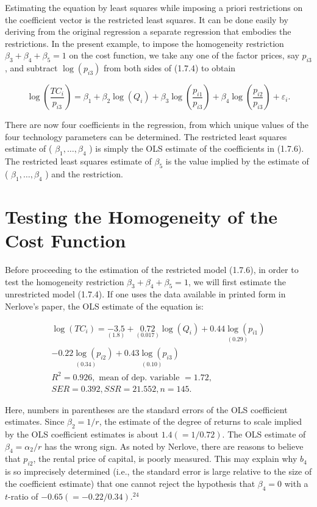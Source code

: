 \documentclass[10pt]{article}
\begin{document}
Estimating the equation by least squares while imposing a priori restrictions on the coefficient vector is the restricted least squares. It can be done easily by deriving from the original regression a separate regression that embodies the restrictions. In the present example, to impose the homogeneity restriction $\beta_{3}+\beta_{4}+\beta_{5}=1$ on the cost function, we take any one of the factor prices, say $p_{i 3}$, and subtract $\log \left(p_{i 3}\right)$ from both sides of (1.7.4) to obtain


\begin{equation*}
\log \left(\frac{T C_{i}}{p_{i 3}}\right)=\beta_{1}+\beta_{2} \log \left(Q_{i}\right)+\beta_{3} \log \left(\frac{p_{i 1}}{p_{i 3}}\right)+\beta_{4} \log \left(\frac{p_{i 2}}{p_{i 3}}\right)+\varepsilon_{i} . \tag{1.7.6}
\end{equation*}


There are now four coefficients in the regression, from which unique values of the four technology parameters can be determined. The restricted least squares estimate of ( $\beta_{1}, \ldots, \beta_{4}$ ) is simply the OLS estimate of the coefficients in (1.7.6). The restricted least squares estimate of $\beta_{5}$ is the value implied by the estimate of ( $\beta_{1}, \ldots, \beta_{4}$ ) and the restriction.

\section*{Testing the Homogeneity of the Cost Function}
Before proceeding to the estimation of the restricted model (1.7.6), in order to test the homogeneity restriction $\beta_{3}+\beta_{4}+\beta_{5}=1$, we will first estimate the unrestricted model (1.7.4). If one uses the data available in printed form in Nerlove's paper, the OLS estimate of the equation is:


\begin{gather*}
\log \left(T C_{i}\right)=\underset{(1.8)}{-3.5}+\underset{(0.017)}{0.72} \log \left(Q_{i}\right)+\underset{(0.29)}{0.44 \log \left(p_{i 1}\right)} \\
-\underset{(0.34)}{0.22 \log \left(p_{i 2}\right)}+\underset{(0.10)}{0.43 \log \left(p_{i 3}\right)} \\
R^{2}=0.926, \text { mean of dep. variable }=1.72, \\
S E R=0.392, S S R=21.552, n=145 .
\end{gather*}


Here, numbers in parentheses are the standard errors of the OLS coefficient estimates. Since $\beta_{2}=1 / r$, the estimate of the degree of returns to scale implied\\
by the OLS coefficient estimates is about $1.4(=1 / 0.72)$. The OLS estimate of $\beta_{4}=\alpha_{2} / r$ has the wrong sign. As noted by Nerlove, there are reasons to believe that $p_{i 2}$, the rental price of capital, is poorly measured. This may explain why $b_{4}$ is so imprecisely determined (i.e., the standard error is large relative to the size of the coefficient estimate) that one cannot reject the hypothesis that $\beta_{4}=0$ with a $t$-ratio of $-0.65(=-0.22 / 0.34) .^{24}$
\end{document}

